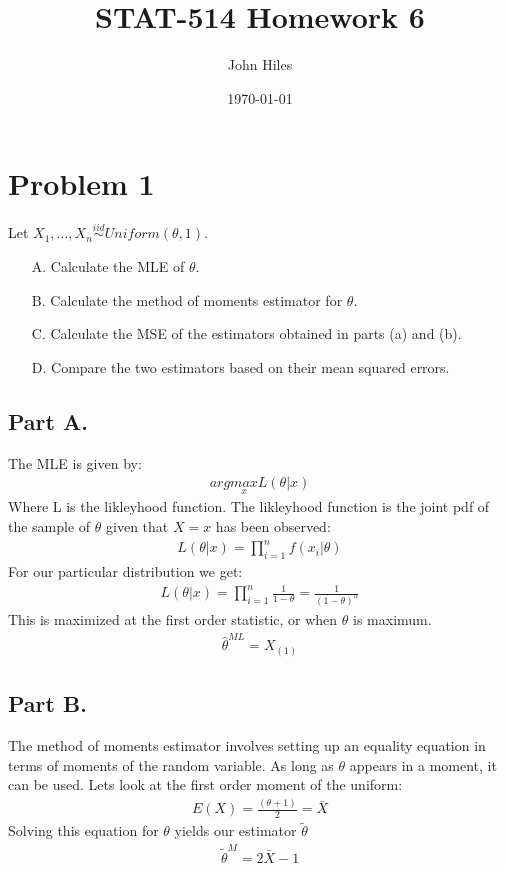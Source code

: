 \documentclass{article}
\title{STAT-514 Homework 6}
\author{John Hiles}
\date\today
\begin{document}
\maketitle %

\section*{Problem 1}
Let $X_1,...,X_n \overset{iid}{\sim} Uniform(\theta,1)$.
\begin{enumerate}
\item[A.] Calculate the MLE of $\theta$.
\item[B.] Calculate the method of moments estimator for $\theta$.
\item[C.] Calculate the MSE of the estimators obtained in parts (a) and (b).
\item[D.] Compare the two estimators based on their mean squared errors.
\end{enumerate}
\subsection*{Part A.}
The MLE is given by:
\begin{align*}
arg \underset{x}{max} L(\theta|x)
\end{align*}
Where L is the likleyhood function. The likleyhood function is the joint pdf of the sample of $\theta$ given that $X=x$ has been observed:
\begin{align*}
L(\theta|x) = \prod_{i=1}^{n} f(x_i|\theta)
\end{align*}
For our particular distribution we get:
\begin{align*}
L(\theta|x) = \prod_{i=1}^{n} \frac{1}{1-\theta} = \frac{1}{(1-\theta)^n}
\end{align*}
This is maximized at the first order statistic, or when $\theta$ is maximum.
\begin{align*}
\boxed{ \hat{\theta}^{ML} = X_{(1)} }
\end{align*}
\subsection*{Part B.}
The method of moments estimator involves setting up an equality equation in terms of moments of the random variable. As long as $\theta$ appears in a moment, it can be used. Lets look at the first order moment of the uniform:
\begin{align*}
E(X) = \frac{(\theta+1)}{2} = \bar{X}
\end{align*}
Solving this equation for $\theta$ yields our estimator $\tilde{\theta}$
\begin{align*}
\boxed{ \tilde{\theta}^{M} = 2\bar{X}-1 }
\end{align*}
\end{document}
